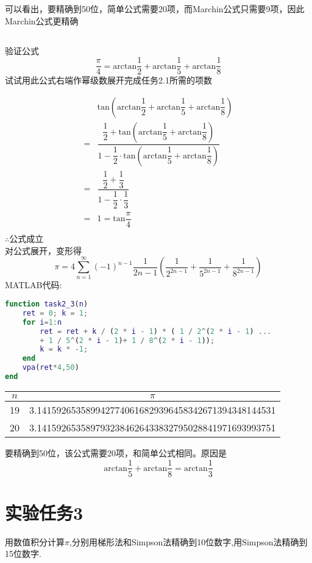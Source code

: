 \documentclass[12pt]{article}
\begin{document}
\begin{CJK*}{UTF8}{gbsn}
	可以看出，要精确到50位，简单公式需要20项，而Marchin公式只需要9项，因此Marchin公式更精确
	
\subsection{}
	 验证公式\\
	 $$\dfrac{\pi}{4}=\mathrm{arctan}\dfrac{1}{2}+\mathrm{arctan}\dfrac{1}{5}+\mathrm{arctan}\dfrac{1}{8}$$
	 试试用此公式右端作幂级数展开完成任务2.1所需的项数
	 
	\begin{align*}
	&\mathrm{tan}\left(\mathrm{arctan}\dfrac{1}{2}+\mathrm{arctan}\dfrac{1}{5}+\mathrm{arctan}\dfrac{1}{8}\right)\\
	=&\dfrac{\dfrac{1}{2}+\mathrm{tan}\left(\mathrm{arctan}\dfrac{1}{5}+\mathrm{arctan}\dfrac{1}{8}\right)}{1-\dfrac{1}{2}\cdot\mathrm{tan}\left(\mathrm{arctan}\dfrac{1}{5}+\mathrm{arctan}\dfrac{1}{8}\right)}\\
	=&\dfrac{\dfrac{1}{2}+\dfrac{1}{3}}{1-\dfrac{1}{2}\cdot\dfrac{1}{3}}\\
	=&1=\mathrm{tan}\dfrac{\pi}{4}\\
	\end{align*}
	$\therefore$公式成立\\
	对公式展开，变形得\\
	$$\pi=4\sum_{n=1}^\infty (-1)^{n-1}\dfrac{1}{2n-1}\left(\dfrac{1}{2^{2n-1}}+\dfrac{1}{5^{2n-1}}+\dfrac{1}{8^{2n-1}}\right)$$
	MATLAB代码:
	\begin{lstlisting}[language=matlab]
function task2_3(n)
    ret = 0; k = 1;
    for i=1:n
        ret = ret + k / (2 * i - 1) * ( 1 / 2^(2 * i - 1) ...
        + 1 / 5^(2 * i - 1)+ 1 / 8^(2 * i - 1));
        k = k * -1; 
    end
    vpa(ret*4,50)
end
	\end{lstlisting}	
	\begin{tabular}{|c|c|}
	\hline
	$n$ & $\pi$\\
	\hline 
	19 & 3.1415926535899427740616829396458342671394348144531 \\ 
	\hline 
	20 & 3.1415926535897932384626433832795028841971693993751 \\ 
	\hline 
	\end{tabular} 
	
	要精确到50位，该公式需要20项，和简单公式相同。原因是$$\mathrm{arctan}\dfrac{1}{5}+\mathrm{arctan}\dfrac{1}{8}=\mathrm{arctan}\dfrac{1}{3}$$
\section{实验任务3}
	用数值积分计算$\pi$,分别用梯形法和Simpson法精确到10位数字,用Simpson法精确到15位数字.\\
	

\end{CJK*}
\end{document}
